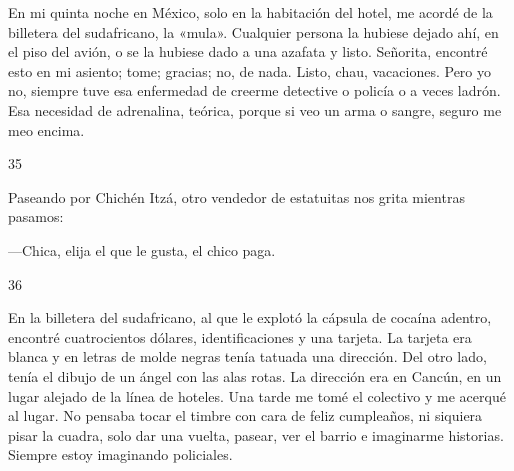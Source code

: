 \documentclass[12pt,twoside,openright,a5paper]{book}
\begin{document}
\nopagebreak

En mi quinta noche en México, solo en la habitación del hotel, me acordé
de la billetera del sudafricano, la «mula». Cualquier persona la hubiese
dejado ahí, en el piso del avión, o se la hubiese dado a una azafata
y listo. Señorita, encontré esto en mi asiento; tome; gracias; no, de
nada. Listo, chau, vacaciones. Pero yo no, siempre tuve esa enfermedad de
creerme detective o policía o a veces ladrón. Esa necesidad de adrenalina,
teórica, porque si veo un arma o sangre, seguro me meo encima.

\vspace{0.5cm}

\hrulefill \hspace{0.1cm}\decofourleft\hspace{0.2cm} 35 \hspace{0.2cm}\decofourright \hspace{0.1cm}\hrulefill

\nopagebreak

\vspace{0.5cm}

\nopagebreak

Paseando por Chichén Itzá, otro vendedor de estatuitas nos grita mientras
pasamos:

---Chica, elija el que le gusta, el chico paga.

\vspace{0.5cm}

\hrulefill \hspace{0.1cm}\decofourleft\hspace{0.2cm} 36 \hspace{0.2cm}\decofourright \hspace{0.1cm}\hrulefill

\nopagebreak

\vspace{0.5cm}

\nopagebreak

En la billetera del sudafricano, al que le explotó la cápsula
de cocaína adentro, encontré cuatrocientos dólares, identificaciones y una
tarjeta. La tarjeta era blanca y en letras de molde negras tenía tatuada
una dirección. Del otro lado, tenía el dibujo de un ángel con las alas
rotas. La dirección era en Cancún, en un lugar alejado de la línea de
hoteles. Una tarde me tomé el colectivo y me acerqué al lugar. No pensaba
tocar el timbre con cara de feliz cumpleaños, ni siquiera pisar la cuadra,
solo dar una vuelta, pasear, ver el barrio e imaginarme historias. Siempre
estoy imaginando policiales.
\end{document}
